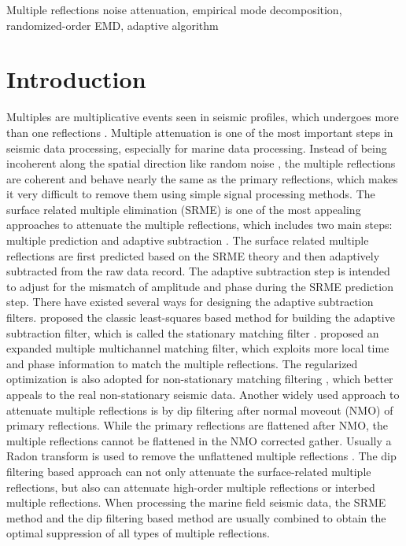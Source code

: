 \begin{keywords}
Multiple reflections noise attenuation, empirical mode decomposition, randomized-order EMD, adaptive algorithm
\end{keywords}

\section{Introduction} 
Multiples are multiplicative events seen in seismic profiles, which undergoes more than one reflections \cite{wujiandemul2016}. Multiple attenuation is one of the most important steps in seismic data processing, especially for marine data processing. Instead of being incoherent along the spatial direction like random noise \cite{hongbo2015,yangkang2016dsd}, the multiple reflections are coherent and behave nearly the same as the primary reflections, which makes it very difficult to remove them using simple signal processing methods. The surface related multiple elimination (SRME) is one of the most appealing approaches to attenuate the multiple reflections, which includes two main steps: multiple prediction and adaptive subtraction \cite{verschuur1992,shoudong2009}.  The surface related multiple reflections are first predicted based on the SRME theory and then adaptively subtracted from the raw data record. The adaptive subtraction step is intended to adjust for the mismatch of amplitude and phase during the SRME prediction step. There have existed several ways for designing the adaptive subtraction filters. \cite{verschuur1992} proposed  the classic least-squares based method for building the adaptive subtraction filter, which is called the stationary matching filter \cite{shebao2015}. \cite{yanghua20031} proposed an expanded multiple multichannel matching filter, which exploits more local time and phase information to match the multiple reflections. The regularized optimization is also adopted for non-stationary matching filtering \cite{fomel20095,yangkang2015ortho}, which better appeals to the real non-stationary seismic data. Another widely used approach to attenuate multiple reflections is by dip filtering after normal moveout (NMO) of primary reflections. While the primary reflections are flattened after NMO, the multiple reflections cannot be flattened in the NMO corrected gather. Usually a Radon transform is used to remove the unflattened multiple reflections \cite{foster1992,yanghua2003,porsani2011,donno2011,zhuang2015,yarudemul2016}. The dip filtering based approach can not only attenuate the surface-related multiple reflections, but also can attenuate high-order multiple reflections or interbed multiple reflections. When processing the marine field seismic data, the SRME method and the dip filtering based method are usually combined to obtain the optimal suppression of all types of multiple reflections.


